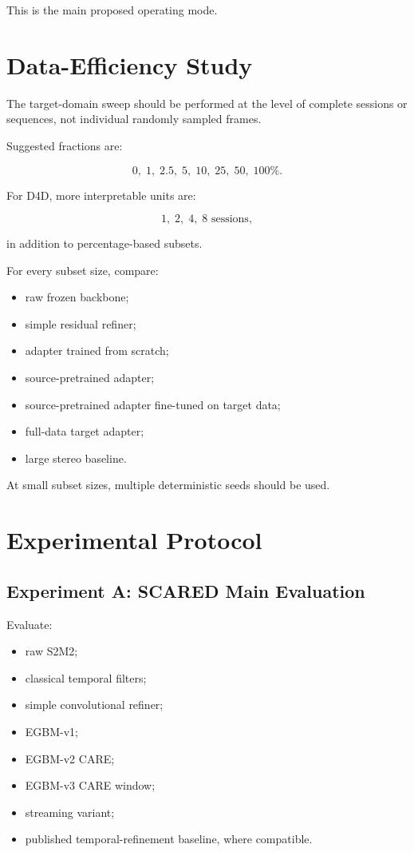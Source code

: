 \documentclass[11pt,a4paper]{article}
\newcommand{\smodel}{S2M2}
\begin{document}
This is the main proposed operating mode.

\section{Data-Efficiency Study}

The target-domain sweep should be performed at the level of complete sessions or
sequences, not individual randomly sampled frames.

Suggested fractions are:

\begin{equation}
    0,\; 1,\; 2.5,\; 5,\; 10,\; 25,\; 50,\; 100\%.
\end{equation}

For D4D, more interpretable units are:

\begin{equation}
    1,\; 2,\; 4,\; 8 \text{ sessions},
\end{equation}

in addition to percentage-based subsets.

For every subset size, compare:

\begin{itemize}[leftmargin=*]
    \item raw frozen backbone;
    \item simple residual refiner;
    \item adapter trained from scratch;
    \item source-pretrained adapter;
    \item source-pretrained adapter fine-tuned on target data;
    \item full-data target adapter;
    \item large stereo baseline.
\end{itemize}

At small subset sizes, multiple deterministic seeds should be used.

\section{Experimental Protocol}

\subsection{Experiment A: SCARED Main Evaluation}

Evaluate:

\begin{itemize}[leftmargin=*]
    \item raw \smodel;
    \item classical temporal filters;
    \item simple convolutional refiner;
    \item EGBM-v1;
    \item EGBM-v2 CARE;
    \item EGBM-v3 CARE window;
    \item streaming variant;
    \item published temporal-refinement baseline, where compatible.
\end{itemize}
\end{document}
